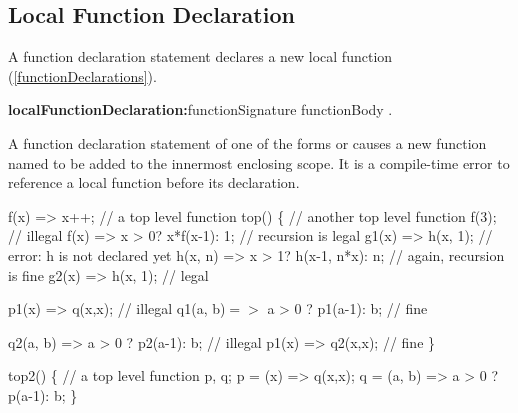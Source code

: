\documentclass{article}
\begin{document}
\subsection{Local Function Declaration}

\LMHash{}
A function declaration statement declares a new local function (\ref{functionDeclarations}).

\begin{grammar}
{\bf localFunctionDeclaration:}functionSignature functionBody
  .
\end{grammar}

\LMHash{}
A function declaration statement of one of the forms
or
causes a new function named \id{} to be added to the innermost enclosing scope.
It is a compile-time error to reference a local function before its declaration.


\begin{dartCode}
f(x) => x++; // a top level function
top() \{ // another top level function
  f(3); // illegal
  f(x) => x > 0? x*f(x-1): 1; // recursion is legal
  g1(x) => h(x, 1); // error: h is not declared yet
  h(x, n) => x > 1? h(x-1, n*x): n; // again, recursion is fine
  g2(x) => h(x, 1); // legal

  p1(x) => q(x,x); // illegal
  q1(a, b)$ =>$ a > 0 ? p1(a-1): b; // fine

  q2(a, b) => a > 0 ? p2(a-1): b; // illegal
  p1(x) => q2(x,x); // fine
\}
\end{dartCode}


\begin{dartCode}
top2() \{ // a top level function
  \VAR{} p, q;
  p = (x) => q(x,x);
  q = (a, b) => a > 0 ? p(a-1): b;
\}
\end{dartCode}

\end{document}
